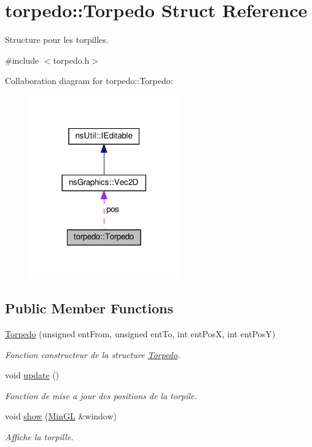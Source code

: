 \hypertarget{structtorpedo_1_1_torpedo}{}\section{torpedo\+:\+:Torpedo Struct Reference}
\label{structtorpedo_1_1_torpedo}


Structure pour les torpilles.  




{\ttfamily \#include $<$torpedo.\+h$>$}



Collaboration diagram for torpedo\+:\+:Torpedo\+:
\nopagebreak
\begin{figure}[H]
\begin{center}
\leavevmode
\includegraphics[width=182pt]{structtorpedo_1_1_torpedo__coll__graph}
\end{center}
\end{figure}
\subsection*{Public Member Functions}
\begin{DoxyCompactItemize}
\item 
\hyperlink{structtorpedo_1_1_torpedo_abab46a6851e2dee478c642856110661a}{Torpedo} (unsigned ent\+From, unsigned ent\+To, int ent\+PosX, int ent\+PosY)
\begin{DoxyCompactList}\small\item\em Fonction constructeur de la structure \hyperlink{structtorpedo_1_1_torpedo}{Torpedo}. \end{DoxyCompactList}\item 
void \hyperlink{structtorpedo_1_1_torpedo_a0dd38313a80970ad026919799214aee3}{update} ()
\begin{DoxyCompactList}\small\item\em Fonction de mise a jour des positions de la torpile. \end{DoxyCompactList}\item 
void \hyperlink{structtorpedo_1_1_torpedo_a00d9c4c8a5277c09d1a2f5c80bc397a7}{show} (\hyperlink{class_min_g_l}{Min\+GL} \&window)
\begin{DoxyCompactList}\small\item\em Affiche la torpille. \end{DoxyCompactList}\end{DoxyCompactItemize}
